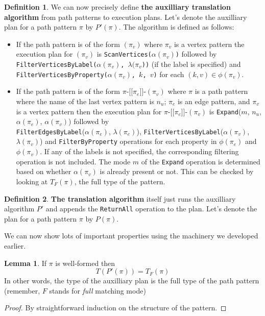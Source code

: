 \documentclass[14pt]{constructor-thesis}
\theoremstyle{definition}
\newtheorem{lemma}{Lemma}
\newtheorem{definition}{Definition}
\newcommand{\patternstart}[1]{(#1)}
\newcommand{\patternhop}[3]{#1 \texttt{-[[} #2 \texttt{]]-} (#3)}
\begin{document}
\begin{definition}
  We can now precisely define \textbf{the auxilliary translation algorithm} from path patterns to execution plans. Let's denote the auxilliary plan for a path pattern $\pi$ by $P'(\pi)$. The algorithm is defined as follows:
  \begin{itemize}
    \item If the path pattern is of the form $\patternstart{\pi_v}$ where $\pi_v$ is a vertex pattern the execution plan for $(\pi_v)$ is \texttt{ScanVertices($\alpha(\pi_v)$)} followed by \texttt{FilterVerticesByLabel($\alpha(\pi_v)$, $\lambda(\pi_v$))} (if the label is specified) and \texttt{FilterVerticesByProperty($\alpha(\pi_v)$, $k$, $v$)} for each $(k, v) \in \phi(\pi_v)$.

    \item If the path pattern is of the form $\patternhop{\pi}{\pi_e}{\pi_v}$ where $\pi$ is a path pattern where the name of the last vertex pattern is $n_u$; $\pi_e$ is an edge pattern, and $\pi_v$ is a vertex pattern then the execution plan for $\patternhop{\pi}{\pi_e}{\pi_v}$ is \texttt{Expand}($m$, $n_u$, $\alpha(\pi_e)$, $\alpha(\pi_v)$) followed by \\ \texttt{FilterEdgesByLabel}($\alpha(\pi_e)$, $\lambda(\pi_e)$), \texttt{FilterVerticesByLabel}($\alpha(\pi_v)$, $\lambda(\pi_v)$) and \texttt{FilterByProperty} operations for each property in $\phi(\pi_e)$ and $\phi(\pi_v)$.
    If any of the labels is not specified, the corresponding filtering operation is not included. The mode $m$ of the \texttt{Expand} operation is determined based on whether $\alpha(\pi_v)$ is already present or not. This can be checked by looking at $T_F(\pi)$, the full type of the pattern.
  \end{itemize} 
\end{definition}

\begin{definition}
  \textbf{The translation algorithm} itself just runs the auxilliary algorithm $P'$ and appends the \texttt{ReturnAll} operation to the plan.
  Let's denote the plan for a path pattern $\pi$ by $P(\pi)$.
\end{definition}

We can now show lots of important properties using the machinery we developed earlier.

\begin{lemma}
  \label{lem:neo4j-translation-type}
  If $\pi$ is well-formed then
  $$T(P'(\pi)) = T_F(\pi)$$
  In other words, the type of the auxilliary plan is the full type of the path pattern (remember, $F$ stands for \textit{full} matching mode)
\end{lemma}
\begin{proof}
  By straightforward induction on the structure of the pattern.
\end{proof}
\end{document}
